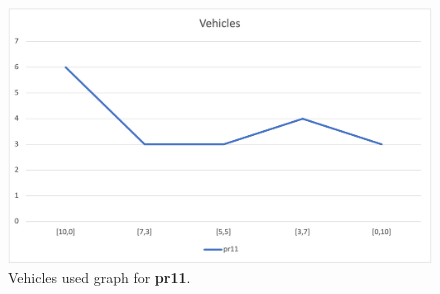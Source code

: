 \begin{figure}[H]
    \centering
    \includegraphics[height=0.25\textheight]{../graphs/pr11-vehicles.png}
    \caption{Vehicles used graph for \textbf{pr11}.}
\end{figure}

\newpage
